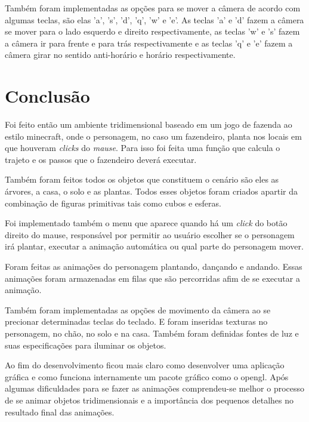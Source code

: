 \documentclass[
	12pt,				%
	openright,			%
	a4paper,			%
	english,			%
	french,				%
	spanish,			%
	brazil,				%
	]{abntex2}
\begin{document}
 Também foram implementadas as opções para se mover a câmera de acordo com algumas teclas, são elas 'a', 's', 'd', 'q', 'w' e 'e'. As teclas 'a' e 'd' fazem a câmera se mover para o lado esquerdo e direito respectivamente, as teclas 'w' e 's' fazem a câmera ir para frente e para trás respectivamente e as teclas 'q' e 'e' fazem a câmera girar no sentido anti-horário e horário respectivamente.




\chapter{Conclusão}

	Foi feito então um ambiente tridimensional baseado em um jogo de fazenda ao estilo minecraft, onde o personagem, no caso um fazendeiro, planta nos locais em que houveram \emph{clicks} do \emph{mause}. Para isso foi feita uma função que calcula o trajeto e os passos que o fazendeiro deverá executar. 

 Também foram feitos todos os objetos que constituem o cenário são eles as árvores, a casa, o solo e as plantas. Todos esses objetos foram criados apartir da combinação de figuras primitivas tais como cubos e esferas.  

Foi implementado também o menu que aparece quando há um \emph{click} do botão direito do mause, responsável por permitir ao usuário escolher se o personagem irá plantar, executar a animação automática ou qual parte do personagem mover. 

Foram feitas as animações do personagem plantando, dançando e andando. Essas animações foram armazenadas em filas que são percorridas afim de se executar a animação.

Também foram implementadas as opções de movimento da câmera ao se precionar determinadas teclas do teclado. E foram inseridas texturas  no personagem, no chão, no solo e na casa. Também foram definidas fontes de luz e suas especificações para iluminar os objetos.

Ao fim do desenvolvimento ficou mais claro como desenvolver uma aplicação gráfica e como funciona internamente um pacote gráfico como o opengl. Após algumas dificuldades para se fazer as animações  comprendeu-se melhor o processo de se animar objetos tridimensionais e a importância dos pequenos detalhes no resultado final das animações.
\nocite{NBR6028:2003}
  \nocite{vianna2001computaccao}
\nocite{pozzeropengl}
\nocite{woo1999opengl}
\nocite{wright2010opengl}
\end{document}
